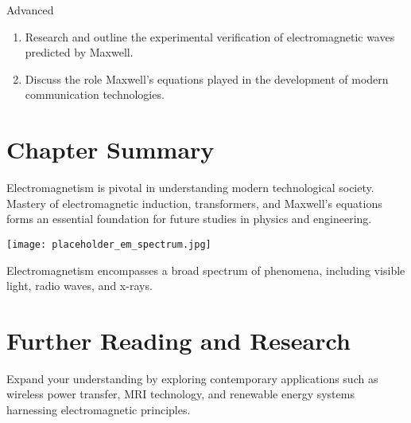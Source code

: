 \begin{tieredquestions}{Advanced}
\begin{enumerate}
    \item Research and outline the experimental verification of electromagnetic waves predicted by Maxwell.
    \item Discuss the role Maxwell's equations played in the development of modern communication technologies.
\end{enumerate}
\end{tieredquestions}

\FloatBarrier

\section{Chapter Summary}
\FloatBarrier

Electromagnetism is pivotal in understanding modern technological society. Mastery of electromagnetic induction, transformers, and Maxwell's equations forms an essential foundation for future studies in physics and engineering.

\begin{marginfigure}[0pt]
\texttt{[image: placeholder\_em\_spectrum.jpg]}
\caption{Electromagnetism encompasses a broad spectrum of phenomena, including visible light, radio waves, and x-rays.}
\end{marginfigure}

\section{Further Reading and Research}
\FloatBarrier

Expand your understanding by exploring contemporary applications such as wireless power transfer, MRI technology, and renewable energy systems harnessing electromagnetic principles.

\FloatBarrier